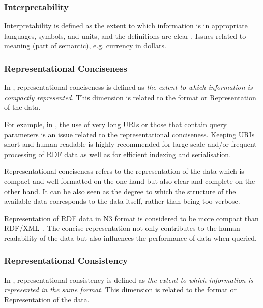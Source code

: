 \subsubsection{Interpretability}
Interpretability is defined as the extent to which information is in appropriate languages, symbols, and units, and the definitions are clear \cite{Bizerthesis}. Issues related to meaning (part of semantic), e.g. currency in dollars.  %

\subsubsection{Representational Conciseness}
In \cite{Bizerthesis}, representational conciseness is defined as \emph{the extent to which information is compactly represented.} 
This dimension is related to the format or Representation of the data.

For example, in \cite{Hogan:2012}, the use of very long URIs or those that contain query parameters is an issue related to the representational conciseness. 
Keeping URIs short and human readable is highly recommended for large scale and/or frequent processing of RDF data as well as for efficient indexing and serialisation. 

\begin{definition}
Representational conciseness refers to the representation of the data which is compact and well formatted on the one hand but also clear and complete on the other hand. 
It can be also seen as the degree to which the structure of the available data corresponds to the data itself, rather than being too verbose. 
\end{definition}

Representation of RDF data in N3 format is considered to be more compact than RDF/XML~\cite{Flemming}.
The concise representation not only contributes to the human readability of the data but also influences the performance of data when queried. 

\subsubsection{Representational Consistency}
In \cite{Bizerthesis}, representational consistency is defined as \emph{the extent to which information is represented in the same format.}
This dimension is related to the format or Representation of the data.

